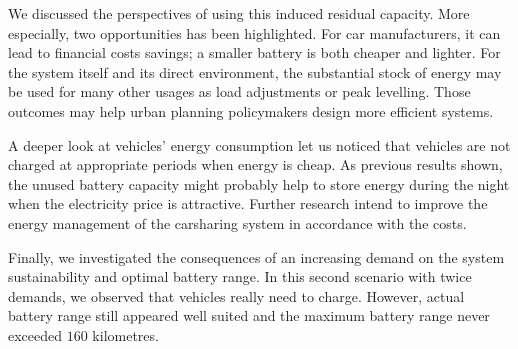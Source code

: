 \begin{bibunit}[ieeetr]
\medskip
We discussed the perspectives of using this induced residual capacity.
More especially, two opportunities has been highlighted.
For car manufacturers, it can lead to financial costs savings; a smaller battery is both cheaper and lighter. %
For the system itself and its direct environment, the substantial stock of energy may be used for many other usages as load adjustments or peak levelling.
Those outcomes may help urban planning policymakers design more efficient systems.

\medskip
A deeper look at vehicles' energy consumption let us noticed that vehicles are not charged at appropriate periods when energy is cheap.
As previous results shown, the unused battery capacity might probably help to store energy during the night when the electricity price is attractive.
Further research intend to improve the energy management of the carsharing system in accordance with the costs.

\medskip
Finally, we investigated the consequences of an increasing demand on the system sustainability and optimal battery range.
In this second scenario with twice demands, we observed that vehicles really need to charge.
However, actual battery range still appeared well suited and the maximum battery range never exceeded $160$ kilometres.



\end{bibunit}
